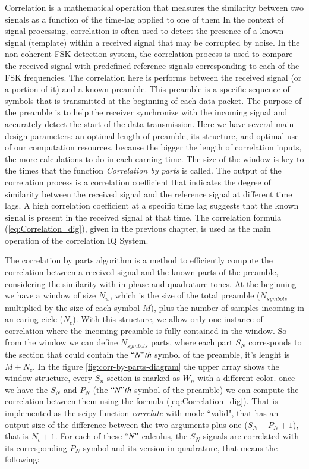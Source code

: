 Correlation is a mathematical operation that measures the similarity between two signals as a function of the time-lag applied to one of them %
In the context of signal processing, correlation is often used to detect the presence of a known signal (template) within a received signal that may be corrupted by noise.
In the non-coherent FSK detection system, the correlation process is used to compare the received signal with predefined reference signals corresponding to each of the FSK frequencies. 
The correlation here is performs between the received signal (or a portion of it) and a known preamble.
This preamble is a specific sequence of symbols that is transmitted at the beginning of each data packet. The purpose of the preamble is to help the receiver synchronize with the incoming signal and accurately detect the start of the data transmission. %
Here we have several main design parameters: an optimal length of preamble, its structure, and optimal use of our computation resources, because the bigger the length of correlation inputs, the more calculations to do in each earning time. %
The size of the window is key to the times that the function \textit{Correlation by parts} is called. 
The output of the correlation process is a correlation coefficient that indicates the degree of similarity between the received signal and the reference signal at different time lags. A high correlation coefficient at a specific time lag suggests that the known signal is present in the received signal at that time.
The correlation formula (\ref{eq:Correlation_dig}), given in the previous chapter, is used as the main operation of the correlation IQ System.




The correlation by parts algorithm is a method to efficiently compute the correlation between a received signal and the known parts of the preamble, considering the similarity with in-phase and quadrature tones.
\newp
At the beginning we have a window of size $N_w$, which is the size of the total preamble ($N_{symbols}$ multiplied by the size of each symbol $M$), plus the number of samples incoming in an earing cicle ($N_c$). With this structure, we allow only one instance of correlation where the incoming preamble is fully contained in the window. So from the window we can define $N_{symbols}$ parts, where each part $S_N$ corresponds to the section that could contain the $``N"th$ symbol of the preamble, it's lenght is $M+N_c$. In the figure \ref{fig:corr-by-parts-diagram} the upper array shows the window structure, every $S_n$ section is marked as $W_n$ with a different color.
\newp
once we have the $S_N$ and $P_N$ (the $``N"th$ symbol of the preamble) we can compute the correlation between them using the formula (\ref{eq:Correlation_dig}). That is implemented as the scipy function \textit{correlate} with mode ``valid", that has an output size of the difference between the two arguments plus one ($S_N - P_N + 1$), that is $N_c + 1$. For each of these $``N"$ calculus, the $S_N$ signals are correlated with its corresponding $P_N$ symbol and its version in quadrature, that means the following:

